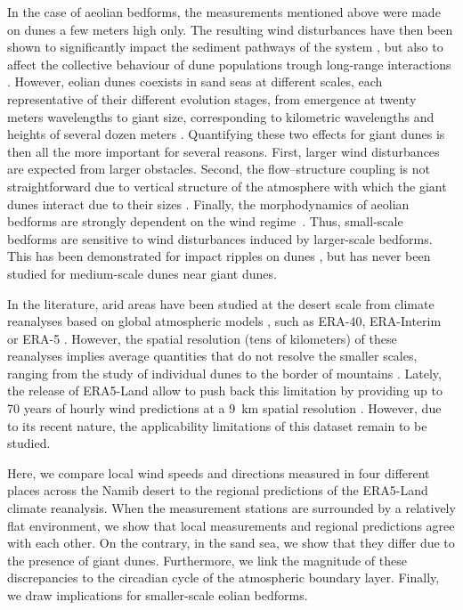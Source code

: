 In the case of aeolian bedforms, the measurements mentioned above were made on dunes a few meters high only. The resulting wind disturbances have then been shown to significantly impact the sediment pathways of the system \citep{Hesp2015}, but also to affect the collective behaviour of dune populations trough long-range interactions \citep{Bacik2020}.
%
However, eolian dunes coexists in sand seas at different scales, each representative of their different evolution stages, from emergence at twenty meters wavelengths to giant size, corresponding to kilometric wavelengths and heights of several dozen meters \citep{McKee1979}. Quantifying these two effects for giant dunes is then all the more important for several reasons.
%
First, larger wind disturbances are expected from larger obstacles.
%
Second, the flow--structure coupling is not straightforward due to vertical structure of the atmosphere with which the giant dunes interact due to their sizes \citep{andreotti2009}.
%
Finally, the morphodynamics of aeolian bedforms are strongly dependent on the wind regime~\citep{Livingstone1996}. Thus, small-scale bedforms are sensitive to wind disturbances induced by larger-scale bedforms. This has been demonstrated for impact ripples on dunes \citep{Howard1977,Hood2021}, but has never been studied for medium-scale dunes near giant dunes.

In the literature, arid areas have been studied at the desert scale from climate reanalyses based on global atmospheric models \citep{Blumberg1996, Livingstone2010, Ashkenazy2012, Jolivet2021, Hu2021}, such as ERA-40, ERA-Interim or ERA-5 \citep{Uppala2005, Dee2011, Hersbach2020}. However, the spatial resolution (tens of kilometers) of these reanalyses implies average quantities that do not resolve the smaller scales, ranging from the study of individual dunes to the border of mountains \citep{Livingstone2010}. Lately, the release of ERA5-Land allow to push back this limitation by providing up to 70 years of hourly wind predictions at a 9~km spatial resolution \citep{munoz2021}. However, due to its recent nature, the applicability limitations of this dataset remain to be studied.

Here, we compare local wind speeds and directions measured in four different places across the Namib desert to the regional predictions of the ERA5-Land climate reanalysis. When the measurement stations are surrounded by a relatively flat environment, we show that local measurements and regional predictions agree with each other. On the contrary, in the sand sea, we show that they differ due to the presence of giant dunes. Furthermore, we link the magnitude of these discrepancies to the circadian cycle of the atmospheric boundary layer. Finally, we draw implications for smaller-scale eolian bedforms.


